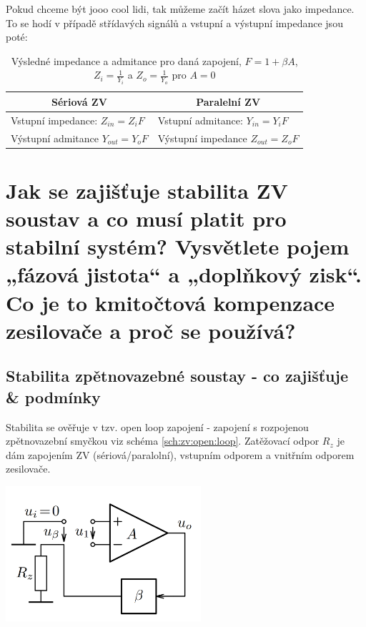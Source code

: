 \documentclass[a4paper,12pt]{article}   %
\begin{document}
Pokud chceme být jooo cool lidi, tak můžeme začít házet slova jako impedance. To se hodí v případě střídavých signálů a vstupní a výstupní impedance jsou poté:
\begin{table}[h!]
    \centering
    \begin{tabular}{|l|l|}
        \hline
        \multicolumn{1}{|c|}{Sériová ZV }& \multicolumn{1}{|c|}{Paralelní ZV}\\\hline\hline
        Vstupní impedance: $Z_{in} = Z_i F$ & Vstupní admitance: $Y_{in} = Y_i F$\\\hline
        Výstupní admitance $Y_{out} = Y_o F$ & Výstupní impedance $Z_{out} = Z_o F$\\\hline
    \end{tabular}
    \caption{Výsledné impedance a admitance pro daná zapojení, $F=1+\beta A$, $Z_i = \frac{1}{Y_i}$ a $Z_o = \frac{1}{Y_o}$ pro $A=0$}
\end{table}%










\section{Jak se zajišťuje stabilita ZV soustav a co musí platit pro stabilní systém? Vysvětlete pojem „fázová jistota“ a „doplňkový zisk“. Co je to kmitočtová kompenzace zesilovače a proč se používá?}
\subsection{Stabilita zpětnovazebné soustay - co zajišťuje \& podmínky}
Stabilita se ověřuje v tzv. open loop zapojení - zapojení s rozpojenou zpětnovazební smyčkou viz schéma \ref{sch:zv:open:loop}. Zatěžovací odpor $R_z$ je dám zapojením ZV (sériová/paralolní), vstupním odporem a vnitřním odporem zesilovače.
\begin{schema}
    \centering
    \includegraphics[height=5cm]{ZV-open_loop.PNG}
    \caption{Určení přenosu rozpojené ZV smyčky}
    \label{sch:zv:open:loop}
\end{schema}
\end{document}
